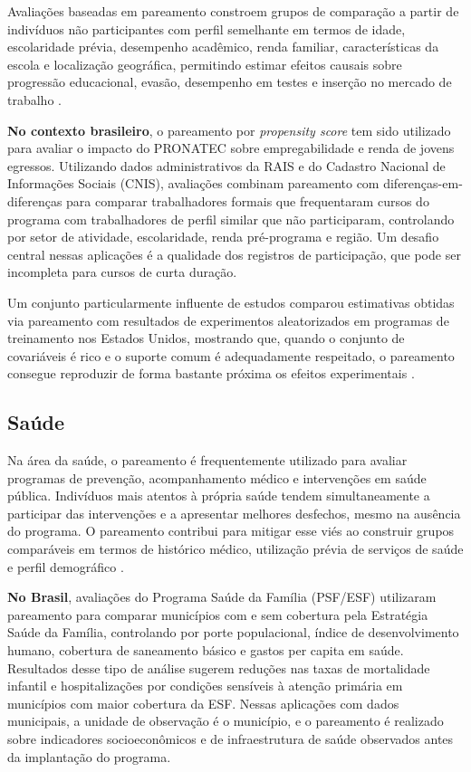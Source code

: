 \documentclass[12pt,a4paper]{article}
\begin{document}
Avaliações baseadas em pareamento constroem grupos de comparação a partir de indivíduos não participantes com perfil semelhante em termos de idade, escolaridade prévia, desempenho acadêmico, renda familiar, características da escola e localização geográfica, permitindo estimar efeitos causais sobre progressão educacional, evasão, desempenho em testes e inserção no mercado de trabalho \citep{heckman1997matching,smith2005does}.

\textbf{No contexto brasileiro}, o pareamento por \textit{propensity score} tem sido utilizado para avaliar o impacto do PRONATEC sobre empregabilidade e renda de jovens egressos. Utilizando dados administrativos da RAIS e do Cadastro Nacional de Informações Sociais (CNIS), avaliações combinam pareamento com diferenças-em-diferenças para comparar trabalhadores formais que frequentaram cursos do programa com trabalhadores de perfil similar que não participaram, controlando por setor de atividade, escolaridade, renda pré-programa e região. Um desafio central nessas aplicações é a qualidade dos registros de participação, que pode ser incompleta para cursos de curta duração.

Um conjunto particularmente influente de estudos comparou estimativas obtidas via pareamento com resultados de experimentos aleatorizados em programas de treinamento nos Estados Unidos, mostrando que, quando o conjunto de covariáveis é rico e o suporte comum é adequadamente respeitado, o pareamento consegue reproduzir de forma bastante próxima os efeitos experimentais \citep{dehejia1999causal,dehejia2002propensity}.

\subsection*{Saúde}

Na área da saúde, o pareamento é frequentemente utilizado para avaliar programas de prevenção, acompanhamento médico e intervenções em saúde pública. Indivíduos mais atentos à própria saúde tendem simultaneamente a participar das intervenções e a apresentar melhores desfechos, mesmo na ausência do programa. O pareamento contribui para mitigar esse viés ao construir grupos comparáveis em termos de histórico médico, utilização prévia de serviços de saúde e perfil demográfico \citep{stuart2010matching}.

\textbf{No Brasil}, avaliações do Programa Saúde da Família (PSF/ESF) utilizaram pareamento para comparar municípios com e sem cobertura pela Estratégia Saúde da Família, controlando por porte populacional, índice de desenvolvimento humano, cobertura de saneamento básico e gastos per capita em saúde. Resultados desse tipo de análise sugerem reduções nas taxas de mortalidade infantil e hospitalizações por condições sensíveis à atenção primária em municípios com maior cobertura da ESF. Nessas aplicações com dados municipais, a unidade de observação é o município, e o pareamento é realizado sobre indicadores socioeconômicos e de infraestrutura de saúde observados antes da implantação do programa.
\end{document}
